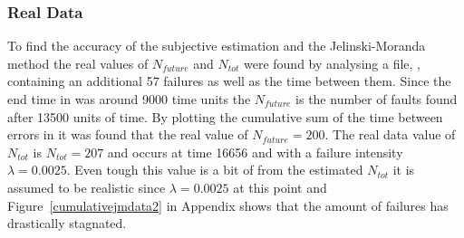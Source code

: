 \subsubsection*{Real Data}
\label{realdatajm}
To find the accuracy of the subjective estimation and the Jelinski-Moranda method the real values of $N_{future}$ and $N_{tot}$ were found by analysing a file, , containing an additional 57 failures as well as the time between them. Since the end time in  was around 9000 time units the $N_{future}$ is the number of faults found after 13500 units of time. By plotting the cumulative sum of the time between errors in  it was found that the real value of $N_{future}=200$. The real data value of $N_{tot}$ is $N_{tot}=207$ and occurs at time 16656 and with a failure intensity $\lambda=0.0025$. Even tough this value is a bit of from the estimated $N_{tot}$ it is assumed to be realistic since $\lambda=0.0025$ at this point and Figure~\ref{cumulativejmdata2} in Appendix shows that the amount of failures has drastically stagnated.